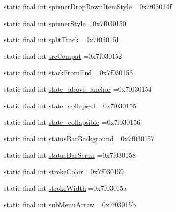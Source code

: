 \begin{DoxyCompactItemize}
\item 
static final int \mbox{\hyperlink{classcom_1_1example_1_1trainawearapplication_1_1_r_1_1attr_a5f9b846cc3c89e55e3f48d919f1339b3}{spinner\+Drop\+Down\+Item\+Style}} =0x7f03014f
\item 
static final int \mbox{\hyperlink{classcom_1_1example_1_1trainawearapplication_1_1_r_1_1attr_a2ca6d39b9e2f4152353d2d8038e771f8}{spinner\+Style}} =0x7f030150
\item 
static final int \mbox{\hyperlink{classcom_1_1example_1_1trainawearapplication_1_1_r_1_1attr_a2612dc2dd334b1f025ccc53a49b8c037}{split\+Track}} =0x7f030151
\item 
static final int \mbox{\hyperlink{classcom_1_1example_1_1trainawearapplication_1_1_r_1_1attr_ae40e8418b31c9577214fac9b00bbf81c}{src\+Compat}} =0x7f030152
\item 
static final int \mbox{\hyperlink{classcom_1_1example_1_1trainawearapplication_1_1_r_1_1attr_aa7e988dc74000a8a618215e1f37ccf16}{stack\+From\+End}} =0x7f030153
\item 
static final int \mbox{\hyperlink{classcom_1_1example_1_1trainawearapplication_1_1_r_1_1attr_ad05ba3bebeba2ae8099070185cac3cd8}{state\+\_\+above\+\_\+anchor}} =0x7f030154
\item 
static final int \mbox{\hyperlink{classcom_1_1example_1_1trainawearapplication_1_1_r_1_1attr_ad73414fe24d691a78d355552b068aefa}{state\+\_\+collapsed}} =0x7f030155
\item 
static final int \mbox{\hyperlink{classcom_1_1example_1_1trainawearapplication_1_1_r_1_1attr_a3818c6d581680ca8f30348c0c7640da4}{state\+\_\+collapsible}} =0x7f030156
\item 
static final int \mbox{\hyperlink{classcom_1_1example_1_1trainawearapplication_1_1_r_1_1attr_a6dbc278ab5b00fe7fe4a0a17c0253026}{status\+Bar\+Background}} =0x7f030157
\item 
static final int \mbox{\hyperlink{classcom_1_1example_1_1trainawearapplication_1_1_r_1_1attr_afbf9816fafd09b2a2987b42150919fb3}{status\+Bar\+Scrim}} =0x7f030158
\item 
static final int \mbox{\hyperlink{classcom_1_1example_1_1trainawearapplication_1_1_r_1_1attr_a0e5a40e42df2c80948977bb6b835b601}{stroke\+Color}} =0x7f030159
\item 
static final int \mbox{\hyperlink{classcom_1_1example_1_1trainawearapplication_1_1_r_1_1attr_a98158d450e24db795fd993f7c358336a}{stroke\+Width}} =0x7f03015a
\item 
static final int \mbox{\hyperlink{classcom_1_1example_1_1trainawearapplication_1_1_r_1_1attr_a3fb7a4acfae4963d8dbcdc217db72525}{sub\+Menu\+Arrow}} =0x7f03015b

\end{DoxyCompactItemize}
